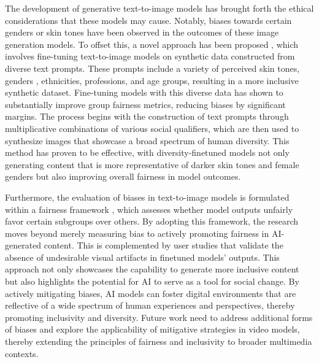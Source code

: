 \documentclass[11pt,a4paper,oneside]{report}
\begin{document}
The development of generative text-to-image models has brought forth the ethical considerations that these models may cause. 
Notably, biases towards certain genders or skin tones have been observed in the outcomes of these image generation models. 
To offset this, a novel approach has been proposed \cite{esposito2023mitigating}, which involves fine-tuning text-to-image models on synthetic data constructed from diverse text prompts. 
These prompts include a variety of perceived skin tones, genders \cite{buolamwini2018gender}, ethnicities, professions, and age groups, resulting in a more inclusive synthetic dataset. 
Fine-tuning models with this diverse data has shown to substantially improve group fairness metrics, reducing biases by significant margins.
The process begins with the construction of text prompts through multiplicative combinations of various social qualifiers, which are then used to synthesize images that showcase a broad spectrum of human diversity. 
This method has proven to be effective, with diversity-finetuned models not only generating content that is more representative of darker skin tones and female genders but also improving overall fairness in model outcomes.

Furthermore, the evaluation of biases in text-to-image models is formulated within a fairness framework \cite{selbst2019fairness}, which assesses whether model outputs unfairly favor certain subgroups over others. 
By adopting this framework, the research moves beyond merely measuring bias to actively promoting fairness in AI-generated content. 
This is complemented by user studies that validate the absence of undesirable visual artifacts in finetuned models' outputs.
This approach not only showcases the capability to generate more inclusive content but also highlights the potential for AI to serve as a tool for social change. 
By actively mitigating biases, AI models can foster digital environments that are reflective of a wide spectrum of human experiences and perspectives, thereby promoting inclusivity and diversity.
Future work need to address additional forms of biases and explore the applicability of mitigative strategies in video models, thereby extending the principles of fairness and inclusivity to broader multimedia contexts.
\end{document}
